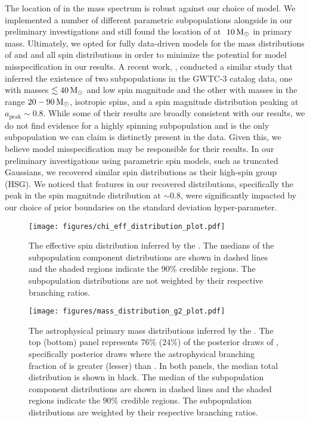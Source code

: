 The location of \first{} in the mass spectrum is robust against our choice of model. We implemented a number of different parametric subpopulations alongside \first{} in our preliminary investigations and still found the location of \first{} at $~10{\,\rm M}_\odot$ in primary mass. Ultimately, we opted for fully data-driven models for the mass distributions of \contA{} and \popB{} and all spin distributions in order to minimize the potential for model misspecification in our results. A recent work, \citet{2303.02973}, conducted a similar study that inferred the existence of two subpopulations in the GWTC-3 catalog data, one with masses $\lesssim 40{\,\rm M}_\odot$ and low spin magnitude and the other with masses in the range $20-90{\,\rm M}_\odot$, isotropic spins, and a spin magnitude distribution peaking at $a_\text{peak} \sim 0.8$. While some of their results are broadly consistent with our results, we do not find evidence for a highly spinning subpopulation and \first{} is the only subpopulation we can claim is distinctly present in the data. Given this, we believe model misspecification may be responsible for their results. In our preliminary investigations using parametric spin models, such as truncated Gaussians, we recovered similar spin distributions as their high-spin group (HSG). We noticed that features in our recovered distributions, specifically the peak in the spin magnitude distribution at $\sim 0.8$, were significantly impacted by our choice of prior boundaries on the standard deviation hyper-parameter.


 \begin{figure}[b]
  \begin{centering}
      \texttt{[image: figures/chi\_eff\_distribution\_plot.pdf]}
      \caption{The effective spin distribution inferred by the \comp{}. The medians of the subpopulation component distributions are shown in dashed lines and the shaded regions indicate the $90\%$ credible regions. The subpopulation distributions are not weighted by their respective branching ratios.}
      \label{fig:chi_eff_distributions}
  \end{centering}
\end{figure}

\begin{figure*}[ht!]
  \begin{centering}
      \texttt{[image: figures/mass\_distribution\_g2\_plot.pdf]}
      \caption{The astrophysical primary mass distributions inferred by the \comp{}. The top (bottom) panel represents $76\%$ ($24\%$) of the posterior draws of \comp{}, specifically posterior draws where the astrophysical branching fraction of \contA{} is greater (lesser) than \contB{}. In both panels, the median total distribution is shown in black. The median of the subpopulation component distributions are shown in dashed lines and the shaded regions indicate the $90\%$ credible regions. The subpopulation distributions are weighted by their respective branching ratios.}
      \label{fig:g2_mass_distribution}
  \end{centering}
\end{figure*} 

